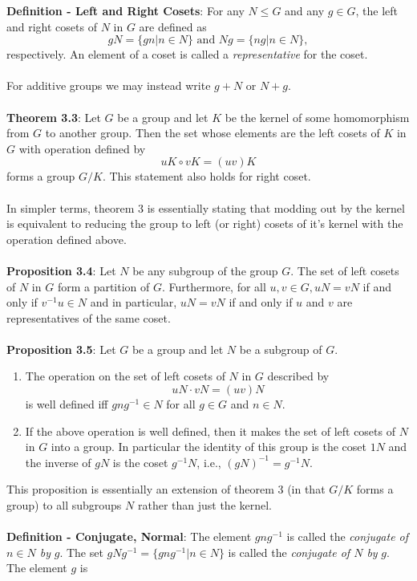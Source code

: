 \documentclass{article}
\begin{document}
\textbf{Definition - Left and Right Cosets}: For any $N \leq G$ and any $g \in G$, the left and right cosets of $N$ in $G$ are defined as $$gN = \{gn | n \in N\} \text{ and } Ng = \{ng | n \in N\},$$ respectively. An element of a coset is called a \textit{representative} for the coset. \\ \\
For additive groups we may instead write $g + N$ or $N + g$. \\ \\
\textbf{Theorem 3.3}: Let $G$ be a group and let $K$ be the kernel of some homomorphism from $G$ to another group. Then the set whose elements are the left cosets of $K$ in $G$ with operation defined by $$uK \circ vK = (uv)K$$ forms a group $G/K$. This statement also holds for right coset. \\ \\
In simpler terms, theorem 3 is essentially stating that modding out by the kernel is equivalent to reducing the group to left (or right) cosets of it's kernel with the operation defined above. \\ \\
\textbf{Proposition 3.4}: Let $N$ be any subgroup of the group $G$. The set of left cosets of $N$ in $G$ form a partition of $G$. Furthermore, for all $u, v \in G, uN = vN$ if and only if $v^{-1}u \in N$ and in particular, $uN = vN$ if and only if $u$ and $v$ are representatives of the same coset. \\ \\
\textbf{Proposition 3.5}: Let $G$ be a group and let $N$ be a subgroup of $G$. \begin{enumerate}
    \item The operation on the set of left cosets of $N$ in $G$ described by $$uN \cdot vN = (uv)N$$ is well defined iff $gng^{-1} \in N$ for all $g \in G$ and $n \in N$.
    \item If the above operation is well defined, then it makes the set of left cosets of $N$ in $G$ into a group. In particular the identity of this group is the coset $1N$ and the inverse of $gN$ is the coset $g^{-1}N$, i.e., $(gN)^{-1} = g^{-1}N$.
\end{enumerate} This proposition is essentially an extension of theorem 3 (in that $G/K$ forms a group) to all subgroups $N$ rather than just the kernel. \\ \\
\textbf{Definition - Conjugate, Normal}: The element $gng^{-1}$ is called the \textit{conjugate of $n \in N$ by} $g$. The set $gNg^{-1} = \{gng^{-1} | n \in N\}$ is called the \textit{conjugate of $N$ by} $g$. The element $g$ is
\end{document}
